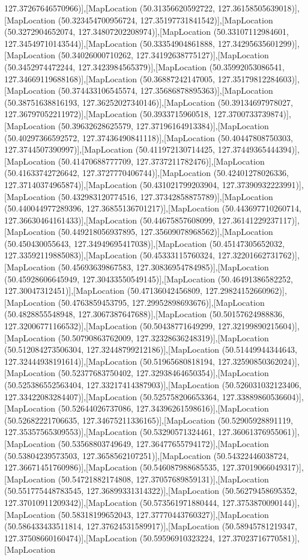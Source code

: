 127.37267646570966)],[MapLocation (50.31356620592722, 127.36158505639018)],[MapLocation (50.323454700956724, 127.35197731841542)],[MapLocation (50.3272904652074, 127.34807202208974)],[MapLocation (50.33107112984601, 127.34549710143544)],[MapLocation (50.33354904861888, 127.34295635601299)],[MapLocation (50.34026000710262, 127.34192638775127)],[MapLocation (50.3452974472244, 127.3423984565379)],[MapLocation (50.35992053086541, 127.34669119688168)],[MapLocation (50.36887242147005, 127.35179812284603)],[MapLocation (50.374433106545574, 127.35686878895363)],[MapLocation (50.38751638816193, 127.36252027340146)],[MapLocation (50.39134697978027, 127.36797052211972)],[MapLocation (50.3933715960518, 127.3700733739874)],[MapLocation (50.39632628625579, 127.37196164913384)],[MapLocation (50.40297366592572, 127.37436490841118)],[MapLocation (50.40447808750303, 127.3744507390997)],[MapLocation (50.411972130714425, 127.37449365444394)],[MapLocation (50.41470688777709, 127.3737211782476)],[MapLocation (50.41633742726642, 127.3727770406744)],[MapLocation (50.42401278026336, 127.37140374965874)],[MapLocation (50.431021799203904, 127.37390932223991)],[MapLocation (50.432983120774516, 127.37342858875789)],[MapLocation (50.440044977289396, 127.36855136701217)],[MapLocation (50.443697710260714, 127.36630464161433)],[MapLocation (50.44675857608099, 127.36141229237117)],[MapLocation (50.449218056937895, 127.35609078968562)],[MapLocation (50.450430055643, 127.34949695417038)],[MapLocation (50.45147305652032, 127.33592119885083)],[MapLocation (50.45333115760324, 127.32201662731762)],[MapLocation (50.45693639867583, 127.30836954784985)],[MapLocation (50.45928606645949, 127.30433550549145)],[MapLocation (50.46491386582252, 127.30047312451)],[MapLocation (50.47136042456809, 127.29824152660962)],[MapLocation (50.4763859453795, 127.29952898693676)],[MapLocation (50.4828855548948, 127.3067387647688)],[MapLocation (50.50157624988836, 127.32006771166532)],[MapLocation (50.50438771649299, 127.32199890215604)],[MapLocation (50.50790863762009, 127.32328636248319)],[MapLocation (50.512084273506304, 127.32448799212186)],[MapLocation (50.51449944344643, 127.32444938191614)],[MapLocation (50.51965680818194, 127.32590850362024)],[MapLocation (50.52377683750402, 127.32938464650354)],[MapLocation (50.525386552563404, 127.33217414387903)],[MapLocation (50.526031032123406, 127.33422083284407)],[MapLocation (50.525758206653364, 127.33889860536604)],[MapLocation (50.52644026737086, 127.34396261598616)],[MapLocation (50.52682221706635, 127.34675211336165)],[MapLocation (50.52905928891119, 127.35357565309553)],[MapLocation (50.53290571324461, 127.36061376955061)],[MapLocation (50.53568803749649, 127.36477655794172)],[MapLocation (50.53804239573503, 127.3658562107251)],[MapLocation (50.54322446038724, 127.36671451760986)],[MapLocation (50.546087988685535, 127.37019066049317)],[MapLocation (50.54721882174808, 127.37057689859131)],[MapLocation (50.551775448783545, 127.36899331314322)],[MapLocation (50.56279458695352, 127.37010911209342)],[MapLocation (50.573561971880444, 127.3753870090144)],[MapLocation (50.58318199652043, 127.37770443760327)],[MapLocation (50.586433433511814, 127.37624531589917)],[MapLocation (50.58945781219347, 127.37508660160474)],[MapLocation (50.59596910323224, 127.37023716770581)],[MapLocation 